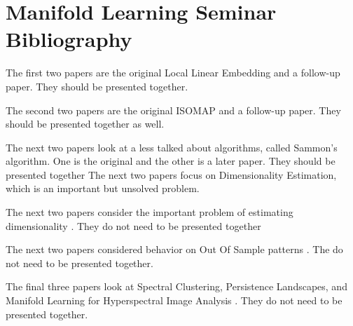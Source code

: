 \documentclass[journal]{IEEEtran}
\begin{document}
\section{\textbf{Manifold Learning Seminar Bibliography}}




The first two papers are the original Local Linear Embedding and a follow-up paper.  \cite{OrigLLE, LLE} They should be presented together.

The second two papers are the original ISOMAP and a follow-up paper.  \cite{OrigISO, IsoMultiMan} They should be presented together as well.

The next two papers look at a less talked about algorithms, called Sammon's algorithm.  One is the original and the other is a later paper.  They should be presented together \cite{SammonOrig, SammonBregDiv}
The next two papers focus on Dimensionality Estimation, which is an important but unsolved problem. 

The next two papers consider the important problem of estimating dimensionality \cite{TensorVoteDimMan, EntropicGraphsDimMan}.  They do not need to be presented together

The next two papers considered behavior on Out Of Sample patterns \cite{OOSManClass, OOSManBengioEtAl}.  The do not need to be presented together.

The final three papers look at Spectral Clustering, Persistence Landscapes,  and Manifold Learning for Hyperspectral Image Analysis \cite{SpecClusMan, BubenikPersistent, ManFeatHSIReview, ManGraphSemiHSIClass}.  They do not need to be presented together.


\end{document}
